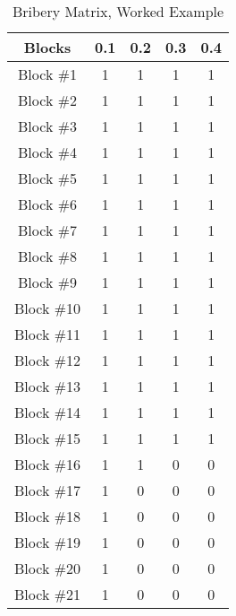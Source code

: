 \documentclass[runningheads]{llncs}
\begin{document}
\begin{subappendices}
\begin{table}[ht]
\caption{Bribery Matrix, Worked Example} 
\centering
\begin{tabular}{|c| c c c c|} 
 \hline
 Blocks & 0.1 & 0.2 & 0.3 & 0.4 \\
 \hline
 Block \#1 & 1 &  1 &  1 &  1 \\
 \hline
 Block \#2 & 1 &  1 &  1 &  1 \\
 \hline
 Block \#3 & 1 &  1 &  1 &  1 \\
 \hline
 Block \#4 & 1 &  1 &  1 &  1 \\
 \hline
 Block \#5 & 1 &  1 &  1 &  1 \\
 \hline
 Block \#6 & 1 &  1 &  1 &  1 \\
 \hline
 Block \#7 & 1 &  1 &  1 &  1 \\
 \hline
 Block \#8 & 1 &  1 &  1 &  1 \\
 \hline
 Block \#9 & 1 &  1 &  1 &  1 \\
 \hline
 Block \#10 & 1 &  1 &  1 &  1 \\
 \hline
 Block \#11 & 1 &  1 &  1 &  1 \\
 \hline
 Block \#12 & 1 &  1 &  1 &  1 \\
 \hline
 Block \#13 & 1 &  1 &  1 &  1 \\
 \hline
 Block \#14 & 1 &  1 &  1 &  1 \\
 \hline
  Block \#15 & 1 &  1 &  1 &  1 \\
 \hline
 Block \#16 & 1 &  1 &  0 &  0 \\
 \hline
 Block \#17 & 1 &  0 &  0 &  0 \\
 \hline
 Block \#18 & 1 &  0 &  0 &  0 \\
 \hline
 Block \#19 & 1 &  0 &  0 &  0 \\
 \hline
 Block \#20 & 1 &  0 &  0 &  0 \\
 \hline
 Block \#21 & 1 &  0 &  0 &  0 \\ 
 \hline
 \end{tabular}
\label{table:bribery_matrix}
\end{table}


\end{subappendices}
\end{document}
